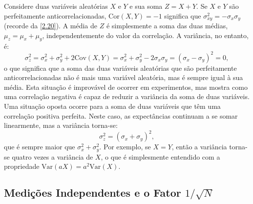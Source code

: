 \begin{exemplo}{}{}
Considere duas variáveis aleatórias $ X $ e $ Y $ e sua soma $ Z = X + Y $. Se $ X $ e $ Y $ são perfeitamente anticorrelacionadas, $ \text{Cor}(X, Y) = -1 $ significa que $ \sigma_{xy}^2 = -\sigma_x \sigma_y $ (recorde da \autoref{2.20}). A média de $ Z $ é simplesmente a soma das duas médias, $ \mu_z = \mu_x + \mu_y $, independentemente do valor da correlação. A variância, no entanto, é:
\begin{equation*}
\sigma_z^2 = \sigma_x^2 + \sigma_y^2 + 2 \text{Cov}(X, Y) = \sigma_x^2 + \sigma_y^2 - 2 \sigma_x \sigma_y = (\sigma_x - \sigma_y)^2 = 0,
\end{equation*}
o que significa que a soma das duas variáveis aleatórias que são perfeitamente anticorrelacionadas não é mais uma variável aleatória, mas é sempre igual à sua média. Esta situação é improvável de ocorrer em experimentos, mas mostra como uma correlação negativa é capaz de reduzir a variância da soma de duas variáveis. Uma situação oposta ocorre para a soma de duas variáveis que têm uma correlação positiva perfeita. Neste caso, as expectâncias continuam a se somar linearmente, mas a variância torna-se:
\begin{equation*}
\sigma_z^2 = (\sigma_x + \sigma_y)^2,
\end{equation*}
que é sempre maior que $ \sigma_x^2 + \sigma_y^2 $. Por exemplo, se $ X = Y $, então a variância torna-se quatro vezes a variância de $ X $, o que é simplesmente entendido com a propriedade $ \text{Var}(aX) = a^2 \text{Var}(X) $.
\end{exemplo}

\subsection{Medições Independentes e o Fator $1/\sqrt{N}$}

